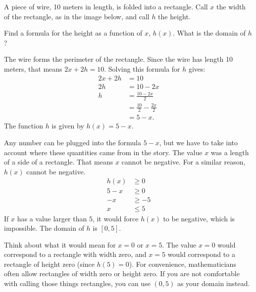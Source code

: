 \documentclass[nooutcomes]{ximera}
\begin{document}
	\begin{example}\label{examp:wirePerimeterDomain}
		A piece of wire, 10 meters in length, is folded into a rectangle. Call $x$ the width of the rectangle, as in the image below, and call $h$ the height.
		\begin{image}
		\end{image}
		Find a formula for the height as a function of $x$, $h(x)$. What is the domain of $h$?
		
		\begin{explanation}
		
			The wire forms the perimeter of the rectangle. Since the wire has length 10 meters, that means $2x + 2h = 10$. Solving this formula 
			for $h$ gives:
			\begin{align*}
				2x + 2h &= 10\\
				2h &= 10 - 2x\\
				h &= \frac{10-2x}{2}\\
					&= \frac{10}{2}-\frac{2x}{2}\\
					&= 5 - x.
			\end{align*}
			The function $h$ is given by $h(x) = 5-x$.
			
			Any number can be plugged into the formula $5-x$, but we have to take into account where these quantities came from in the story.
			The value $x$ was a length of a side of a rectangle. That means $x$ cannot be negative. For a similar reason, $h(x)$ cannot be negative.
			\begin{align*}
				h(x) & \geq 0\\
				5-x & \geq 0\\
				-x & \geq -5\\
				x &\leq 5
			\end{align*}	
			If $x$ has a value larger than $5$, it would force $h(x)$ to be negative, which is impossible. The domain of $h$ is $[0, 5]$.

			\begin{callout}
				Think about what it would mean for $x=0$ or $x=5$. The value $x=0$ would correspond to a rectangle with width zero, and $x=5$ 	
				would correspond to a rectangle of height zero (since $h(5)=0$). For convenience, mathematicians often allow rectangles of width 
				zero or height zero. If you are not comfortable with calling those things rectangles, you can use $(0,5)$ as your domain instead.
			\end{callout}
		\end{explanation}
	
	\end{example}
	
\end{document}
